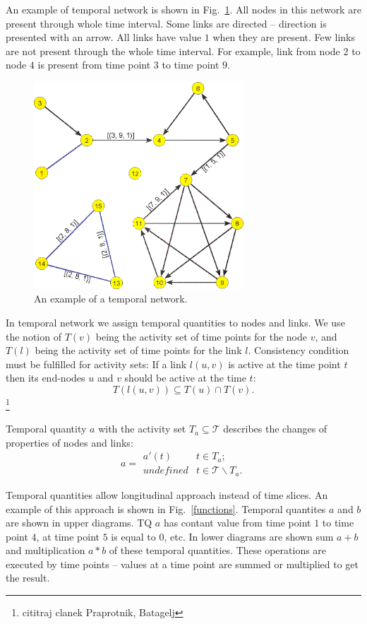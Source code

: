 \documentclass[a4paper,twoside,10pt]{article}
\begin{document}
An example of temporal network is shown in Fig.~\ref{example}. All nodes in this network are present through whole time interval. Some links are directed -- direction is presented with an arrow. All links have value $1$ when they are present. Few links are not present through the whole time interval. For example, link from node $2$ to node $4$ is present from time point $3$ to time point $9$.

\begin{figure}[!h]
	\centering
  \includegraphics[width=0.7\textwidth]{./pics/Fig5.png}
  \caption{An example of a temporal network.}
  \label{example}
\end{figure}

In temporal network we assign temporal quantities to nodes and links. We use the notion of $T(v)$ being the activity set of time points for the node $v$, and $T(l)$ being the activity set of time points for the link $l$. Consistency condition must be fulfilled for activity sets: If a link $l(u, v)$ is active at the time point $t$ then its end-nodes $u$ and $v$ should be active at the time $t:$
$$T(l(u, v)) \subseteq T(u) \cap T(v).$$
\footnote{cititraj clanek Praprotnik, Batagelj}

Temporal quantity $a$ with the activity set $T_a \subseteq \mathcal{T}$ describes the changes of properties of nodes and links:
$$
a =
\begin{array}{ll}
  a'(t) & t \in T_a; \\
  undefined & t \in \mathcal{T}\backslash T_a.
\end{array}
$$

Temporal quantities allow longitudinal approach instead of time slices. An example of this approach is shown in Fig.~\ref{functions}. Temporal quantites $a$ and $b$ are shown in upper diagrams. TQ $a$ has contant value from time point $1$ to time point $4$, at time point $5$ is equal to $0$, etc. In lower diagrams are shown sum $a+b$ and multiplication $a*b$ of these temporal quantities. These operations are executed by time points -- values at a time point are summed or multiplied to get the result.
\end{document}
